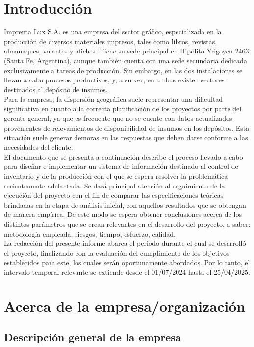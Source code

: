 \documentclass[a4paper, 12pt,twoside]{report}  %
\numberwithin{equation}{subsection} %
\begin{document}
\chapter{Introducción}
\indent Imprenta Lux S.A. es una empresa del sector gráfico, especializada en la producción de diversos materiales impresos, tales como libros, revistas, almanaques, volantes y afiches. Tiene su sede principal en Hipólito Yrigoyen 2463 (Santa Fe, Argentina), aunque también cuenta con una sede secundaria dedicada exclusivamente a tareas de producción. Sin embargo, en las dos instalaciones se llevan a cabo procesos productivos, y, a su vez, en ambas existen sectores destinados al depósito de insumos.\\
\indent Para la empresa, la dispersión geográfica suele representar una dificultad significativa en cuanto a la correcta planificación de los proyectos por parte del gerente general, ya que es frecuente que no se cuente con datos actualizados provenientes de relevamientos de disponibilidad de insumos en los depósitos. Esta situación suele generar demoras en las respuestas que deben darse conforme a las necesidades del cliente.\\
\indent El documento que se presenta a continuación describe el proceso llevado a cabo para diseñar e implementar un sistema de información destinado al control de inventario y de la producción con el que se espera resolver la problemática recientemente adelantada. Se dará principal atención al seguimiento de la ejecución del proyecto con el fin de comparar las especificaciones teóricas brindadas en la etapa de análisis inicial, con aquellos resultados que se obtengan de manera empírica. De este modo se espera obtener conclusiones acerca de los distintos parámetros que se crean relevantes en el desarrollo del proyecto, a saber: metodología empleada, riesgos, tiempo, esfuerzo, calidad.\\
\indent La redacción del presente informe abarca el periodo durante el cual se desarrolló el proyecto, finalizando con la evaluación del cumplimiento de los objetivos establecidos para este, los cuales serán oportunamente abordados. Por lo tanto, el intervalo temporal relevante se extiende desde el 01/07/2024 hasta el 25/04/2025.

\chapter{Acerca de la empresa/organización}
\section{Descripción general de la empresa}
\end{document}
